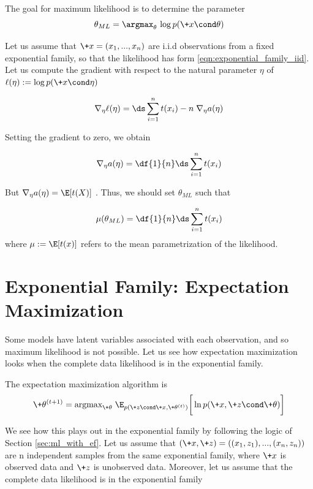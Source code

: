 \documentclass{article} %
\begin{document}
The goal for maximum likelihood is to determine the parameter
\begin{equation}
\label{eqn:ml}
\theta_{ML} = \argmax_\theta  \, \log p(\+x \cond \theta) 
\end{equation}

Let us assume that $\+x=(x_1, ..., x_n)$ are i.i.d observations  from a fixed exponential family, so that the likelihood has form \eqref{eqn:exponential_family_iid}.  Let us compute the gradient with respect to the natural parameter $\eta$ of $\ell(\eta) := \log p(\+x \cond \eta)$

\[ \nabla_\eta \ell(\eta) = \ds\sum_{i=1}^n t(x_i) - n \; \nabla_\eta a(\eta) \]

Setting the gradient to zero, we obtain

\[ \nabla_\eta a(\eta) = \df{1}{n}  \ds\sum_{i=1}^n t(x_i) \]

But $\nabla_\eta a(\eta) = \E [t(X)]$ \cite{jordan_ef}.  Thus, we should set $\theta_{ML}$ such that

\[ \mu(\theta_{ML}) = \df{1}{n} \ds\sum_{i=1}^n t(x_i) \]
where $\mu := \E[t(x)]$ refers to the mean parametrization of the likelihood. 

 \section{Exponential Family: Expectation Maximization} \label{sec:em_with_ef}

Some models have latent variables associated with each observation, and so maximum likelihood is not possible.  Let us see how expectation maximization looks when the complete data likelihood is in the exponential family.

The expectation maximization algorithm is 
\begin{equation}
\label{eqn:em_algorithm_appendix}
 \+\theta^{(t+1)} =  \text{argmax}_{\+\theta} \; \E_{p(\+z \cond \+x , \+\theta^{(t)})} \bigg[ \ln p(\+x, \+z \cond \+\theta) \bigg] 
 \end{equation}

We see how this plays out in the exponential family by following the logic of Section \ref{sec:ml_with_ef}.   Let us assume that $(\+x, \+z)=((x_1,z_1), ..., (x_n, z_n))$ are n independent samples from the same exponential family, where $\+x$ is observed data and $\+z$ is unobserved data.
Moreover, let us assume that the complete data likelihood is in the exponential family
\end{document}
